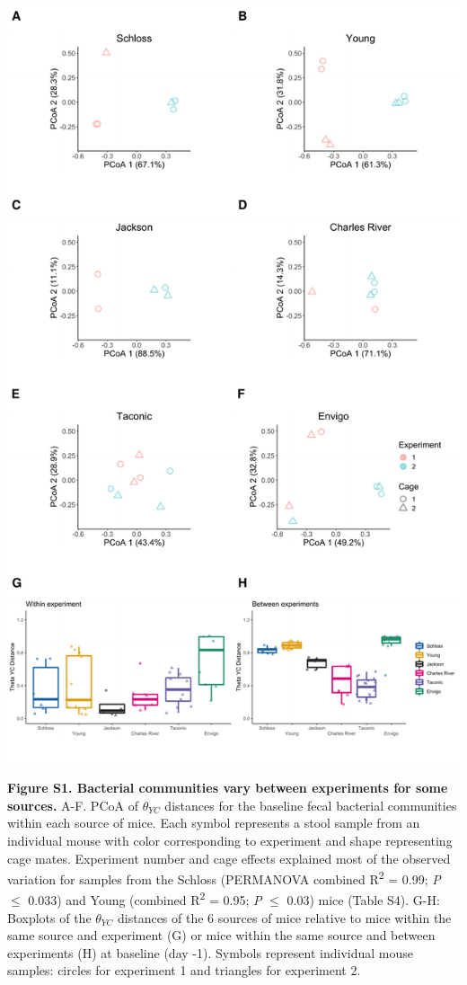 \documentclass[
  11pt,
]{article}
\begin{document}
\includegraphics{figure_S1.pdf}

\textbf{Figure S1. Bacterial communities vary between experiments for
some sources.} A-F. PCoA of \(\theta_{YC}\) distances for the baseline
fecal bacterial communities within each source of mice. Each symbol
represents a stool sample from an individual mouse with color
corresponding to experiment and shape representing cage mates.
Experiment number and cage effects explained most of the observed
variation for samples from the Schloss (PERMANOVA combined
R\textsuperscript{2} = 0.99; \emph{P} \(\le\) 0.033) and Young (combined
R\textsuperscript{2} = 0.95; \emph{P} \(\le\) 0.03) mice (Table S4).
G-H: Boxplots of the \(\theta_{YC}\) distances of the 6 sources of mice
relative to mice within the same source and experiment (G) or mice
within the same source and between experiments (H) at baseline (day -1).
Symbols represent individual mouse samples: circles for experiment 1 and
triangles for experiment 2.
\end{document}
